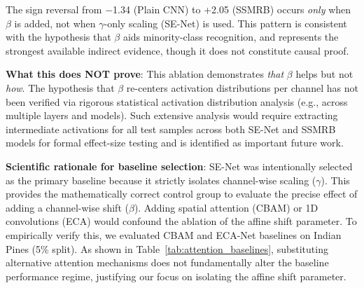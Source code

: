 \documentclass[conference]{IEEEtran}
\begin{document}
\begin{table}[!t]
\caption{AA$-$OA Gap as Indirect Evidence for $\beta$'s Role}
\label{tab:aa_oa_gap}
\centering
{}
\end{table}

The sign reversal from $-$1.34 (Plain CNN) to +2.05 (SSMRB) occurs \textit{only} when $\beta$ is added, not when $\gamma$-only scaling (SE-Net) is used. This pattern is consistent with the hypothesis that $\beta$ aids minority-class recognition, and represents the strongest available indirect evidence, though it does not constitute causal proof.

\textbf{What this does NOT prove}: This ablation demonstrates \textit{that} $\beta$ helps but not \textit{how}. The hypothesis that $\beta$ re-centers activation distributions per channel has not been verified via rigorous statistical activation distribution analysis (e.g., across multiple layers and models). Such extensive analysis would require extracting intermediate activations for all test samples across both SE-Net and SSMRB models for formal effect-size testing and is identified as important future work.

\textbf{Scientific rationale for baseline selection}: SE-Net was intentionally selected as the primary baseline because it strictly isolates channel-wise scaling ($\gamma$). This provides the mathematically correct control group to evaluate the precise effect of adding a channel-wise shift ($\beta$). Adding spatial attention (CBAM) or 1D convolutions (ECA) would confound the ablation of the affine shift parameter. To empirically verify this, we evaluated CBAM and ECA-Net baselines on Indian Pines (5\% split). As shown in Table~\ref{tab:attention_baselines}, substituting alternative attention mechanisms does not fundamentally alter the baseline performance regime, justifying our focus on isolating the affine shift parameter.
\end{document}
